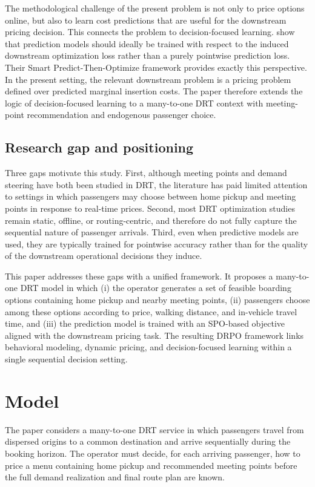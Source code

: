 \documentclass[preprint,12pt,authoryear]{elsarticle}
\begin{document}
The methodological challenge of the present problem is not only to price options online, but also to learn cost predictions that are useful for the downstream pricing decision. This connects the problem to decision-focused learning. \citet{elmachtoub2022} show that prediction models should ideally be trained with respect to the induced downstream optimization loss rather than a purely pointwise prediction loss. Their Smart Predict-Then-Optimize framework provides exactly this perspective. In the present setting, the relevant downstream problem is a pricing problem defined over predicted marginal insertion costs. The paper therefore extends the logic of decision-focused learning to a many-to-one DRT context with meeting-point recommendation and endogenous passenger choice.

\subsection{Research gap and positioning}

Three gaps motivate this study. First, although meeting points and demand steering have both been studied in DRT, the literature has paid limited attention to settings in which passengers may choose between home pickup and meeting points in response to real-time prices. Second, most DRT optimization studies remain static, offline, or routing-centric, and therefore do not fully capture the sequential nature of passenger arrivals. Third, even when predictive models are used, they are typically trained for pointwise accuracy rather than for the quality of the downstream operational decisions they induce.

This paper addresses these gaps with a unified framework. It proposes a many-to-one DRT model in which (i) the operator generates a set of feasible boarding options containing home pickup and nearby meeting points, (ii) passengers choose among these options according to price, walking distance, and in-vehicle travel time, and (iii) the prediction model is trained with an SPO-based objective aligned with the downstream pricing task. The resulting DRPO framework links behavioral modeling, dynamic pricing, and decision-focused learning within a single sequential decision setting.

\section{Model}
\label{sec:model}

The paper considers a many-to-one DRT service in which passengers travel from dispersed origins to a common destination and arrive sequentially during the booking horizon. The operator must decide, for each arriving passenger, how to price a menu containing home pickup and recommended meeting points before the full demand realization and final route plan are known.
\end{document}
